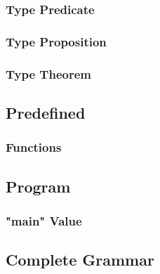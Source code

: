 \documentclass{article}
\begin{document}
\subsubsection{Type Predicate}

\subsubsection{Type Proposition}

\subsubsection{Type Theorem}

\subsection{Predefined}

\subsubsection{Functions}

\subsection{Program}

\subsubsection{"main" Value}

\subsection{Complete Grammar}
\end{document}
